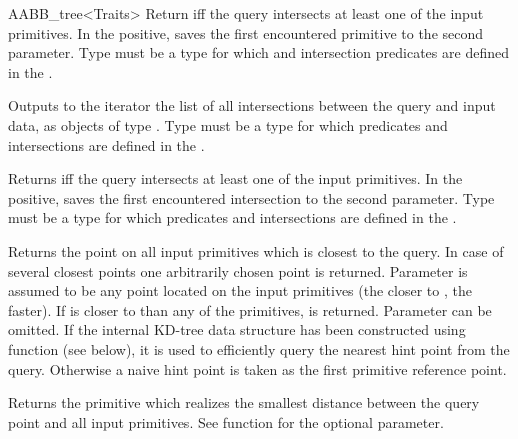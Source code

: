\begin{ccRefClass}{AABB_tree<Traits>}
{Return  iff the query intersects at least one of the input primitives. In the positive, saves the first encountered primitive to the second parameter. Type  must be a type for which  and intersection predicates are defined in the .}

	
{Outputs to the iterator the list of all intersections between the query and input data, as objects of type . Type  must be a type for which  predicates and intersections are defined in the .}

{Returns  iff the query intersects at least one of the input primitives. In the positive, saves the first encountered intersection to the second parameter. Type  must be a type for which  predicates and intersections are defined in the .}



{Returns the point on all input primitives which is closest to the query. In case of several closest points one arbitrarily chosen point is returned.  Parameter  is assumed to be any point located on the input primitives (the closer  to , the faster). If  is closer to  than any of the primitives,  is returned. Parameter  can be omitted. If the internal KD-tree data structure has been constructed using function  (see below), it is used to efficiently query the nearest hint point from the query. Otherwise a naive hint point is taken as the first primitive reference point. }

{Returns the primitive which realizes the smallest distance between the query point and all input primitives. See  function for the optional  parameter. }


\end{ccRefClass}
